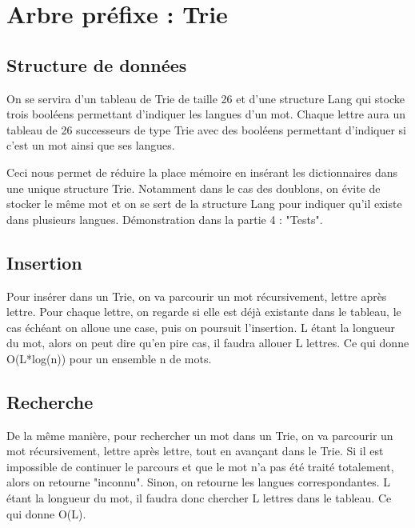 \chapter{Arbre préfixe : Trie}

\section{Structure de données}

On se servira d'un tableau de Trie de taille 26 et d'une structure Lang qui stocke trois booléens permettant d'indiquer les langues d'un mot. \bigskip \newline Chaque lettre aura un tableau de 26 successeurs de type Trie avec des booléens permettant d'indiquer si c'est un mot ainsi que ses langues.

Ceci nous permet de réduire la place mémoire en insérant les dictionnaires dans une unique structure Trie. Notamment dans le cas des doublons, on évite de stocker le même mot et on se sert de la structure Lang pour indiquer qu'il existe dans plusieurs langues. Démonstration dans la partie 4 : "Tests".

\section{Insertion}

Pour insérer dans un Trie, on va parcourir un mot récursivement, lettre après lettre. Pour chaque lettre, on regarde si elle est déjà existante dans le tableau, le cas échéant on alloue une case, puis on poursuit l'insertion.
\bigskip \newline L étant la longueur du mot, alors on peut dire qu'en pire cas, il faudra allouer L lettres. Ce qui donne O(L*log(n)) pour un ensemble n de mots.

\section{Recherche}

De la même manière, pour rechercher un mot dans un Trie, on va parcourir un mot récursivement, lettre après lettre, tout en avançant dans le Trie. Si il est impossible de continuer le parcours et que le mot n'a pas été traité totalement, alors on retourne "inconnu". Sinon, on retourne les langues correspondantes.
 \bigskip \newline L étant la longueur du mot, il faudra donc chercher L lettres dans le tableau. Ce qui donne O(L).
